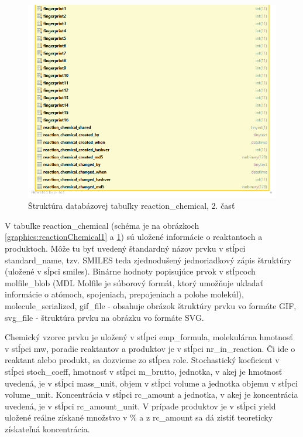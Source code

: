 \documentclass[thesis=M,slovak]{FITthesis}[2013/05/06]
\begin{document}
\begin{figure}\centering
	\includegraphics[width=1.0\textwidth]{Schema_DB_Open_Enventory/reaction_chemical_2.png}
 	\caption[Štruktúra databázovej tabuľky reaction\_chemical, 2. časť]{Štruktúra databázovej tabuľky reaction\_chemical, 2. časť}\label{graphics:reactionChemical2}
\end{figure}

V tabuľke reaction\_chemical (schéma je na obrázkoch \ref{graphics:reactionChemical1} a \ref{graphics:reactionChemical2}) sú uložené informácie o reaktantoch a produktoch. Môže tu byť uvedený štandardný názov prvku v stĺpci standard\_name, tzv. SMILES teda zjednodušený jednoriadkový zápis štruktúry (uložené v sĺpci smiles). Binárne hodnoty popisujúce prvok v stĺpcoch molfile\_blob (MDL Molfile je súborový formát, ktorý umožňuje ukladať informácie o atómoch, spojeniach, prepojeniach a polohe molekúl), molecule\_serialized, gif\_file - obsahuje obrázok štruktúry prvku vo formáte GIF, svg\_file - štruktúra prvku na obrázku vo formáte SVG.

Chemický vzorec prvku je uložený v stĺpci emp\_formula, molekulárna hmotnosť v stĺpci mw, poradie reaktantov a produktov je v stĺpci nr\_in\_reaction. Či ide o reaktant alebo produkt, sa dozvieme zo stĺpca role. Stochastický koeficient v stĺpci stoch\_coeff, hmotnosť v stĺpci m\_brutto, jednotka, v akej je hmotnosť uvedená, je v stĺpci mass\_unit, objem v stĺpci volume a jednotka objemu v stĺpci volume\_unit. Koncentrácia v stĺpci rc\_amount a jednotka, v akej je koncentrácia uvedená, je v stĺpci rc\_amount\_unit.
V prípade produktov je v stĺpci yield uložené reálne získané množstvo v \% a z rc\_amount sa dá zistiť teoreticky získateľná koncentrácia.
\end{document}
